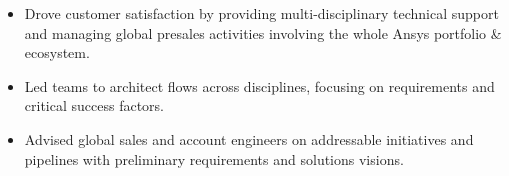 \documentclass[9pt,a4paper,ragged2e,withhyper]{altacv} %
\begin{document}
\begin{paracol}{2}
\begin{itemize}
\item Drove customer satisfaction by providing multi-disciplinary technical support and
managing global presales activities involving the whole Ansys portfolio \& ecosystem.
\item Led teams to architect flows across disciplines, focusing on requirements and
critical success factors.
\item Advised global sales and account engineers on addressable initiatives and pipelines
with preliminary requirements and solutions visions.
\end{itemize}
\divider


\end{paracol}
\end{document}
